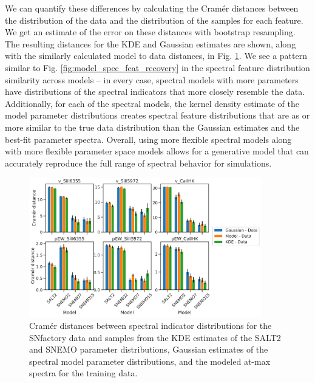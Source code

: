 We can quantify these differences by calculating the Cram\'{e}r distances between the distribution of the data and the distribution of the samples for each feature. We get an estimate of the error on these distances with bootstrap resampling. The resulting distances for the KDE and Gaussian estimates are shown, along with the similarly calculated model to data distances, in Fig. \ref{fig:cramer_spec_feat}. We see a pattern similar to Fig. \ref{fig:model_spec_feat_recovery} in the spectral feature distribution similarity across models -- in every case, spectral models with more parameters have distributions of the spectral indicators that more closely resemble the data. Additionally, for each of the spectral models, the kernel density estimate of the model parameter distributions creates spectral feature distributions that are as or more similar to the true data distribution than the Gaussian estimates and the best-fit parameter spectra. Overall, using more flexible spectral models along with more flexible parameter space models allows for a generative model that can accurately reproduce the full range of spectral behavior for simulations.

\begin{figure}
    \centering
    \includegraphics[width=0.9\textwidth]{figures/snemo_kde/cramer_distances_spec_feats.pdf}
    \caption{Cram\'{e}r distances between spectral indicator distributions for the SNfactory data and samples from the KDE estimates of the SALT2 and SNEMO parameter distributions, Gaussian estimates of the spectral model parameter distributions, and the modeled at-max spectra for the training data.}
    \label{fig:cramer_spec_feat}
\end{figure}

